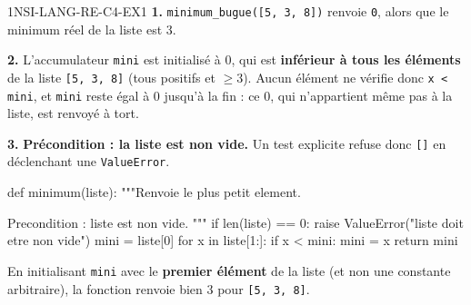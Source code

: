 \begin{corrige}{1NSI-LANG-RE-C4-EX1}
\textbf{1.} \lstinline{minimum_bugue([5, 3, 8])} renvoie \lstinline{0}, alors que le
minimum réel de la liste est $3$.

\textbf{2.} L'accumulateur \lstinline{mini} est initialisé à $0$, qui est \textbf{inférieur
à tous les éléments} de la liste \lstinline{[5, 3, 8]} (tous positifs et $\geqslant3$).
Aucun élément ne vérifie donc \lstinline{x < mini}, et \lstinline{mini} reste égal à $0$
jusqu'à la fin : ce $0$, qui n'appartient même pas à la liste, est renvoyé à tort.

\textbf{3.}
\textbf{Précondition : la liste est non vide.} Un test explicite refuse donc
\lstinline{[]} en déclenchant une \lstinline{ValueError}.

\begin{python}
def minimum(liste):
    """Renvoie le plus petit element.

    Precondition : liste est non vide.
    """
    if len(liste) == 0:
        raise ValueError("liste doit etre non vide")
    mini = liste[0]
    for x in liste[1:]:
        if x < mini:
            mini = x
    return mini
\end{python}
En initialisant \lstinline{mini} avec le \textbf{premier élément} de la liste (et non une
constante arbitraire), la fonction renvoie bien $3$ pour \lstinline{[5, 3, 8]}.
\end{corrige}

%
